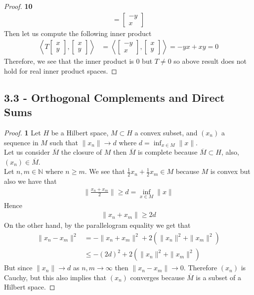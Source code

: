 \documentclass[11pt]{article}
\newcommand{\N}{\mathbb{N}}
\newcommand{\inprd}[1]{\left\langle{#1}\right\rangle}
\theoremstyle{definition}
\begin{document}
\begin{proof}{\textbf{10}}
\begin{align*}
    = \begin{bmatrix} -y \\ x \end{bmatrix}
\end{align*}
Then let us compute the following inner product
\begin{align*}
    \inprd{T\begin{bmatrix} x \\y \end{bmatrix},
    \begin{bmatrix} x \\y \end{bmatrix}}
    &= \inprd{\begin{bmatrix} -y \\x \end{bmatrix},
    \begin{bmatrix} x \\y \end{bmatrix}}
    = -yx + xy = 0
\end{align*}
Therefore, we see that the inner product is 0 but $T \neq 0$ so above result
does not hold for real inner product spaces.
\end{proof}

\cleardoublepage
\subsection*{3.3 - Orthogonal Complements and Direct Sums}
\begin{proof}{\textbf{1}}
Let $H$ be a Hilbert space, $M \subset H$ a convex subset, and $(x_n)$ a
sequence in $M$ such that $\|x_n\| \to d$ where $d = \inf_{x \in M}\|x\|$.
\\
Let us consider $\overline{M}$ the closure of $M$ then $\overline{M}$ is
complete because $\overline{M}\subset H$, also, $(x_n) \in \overline{M}$.
\\
Let $n,m \in \N$ where $n \geq m$.
We see that $\frac{1}{2}x_n + \frac{1}{2}x_m \in M$ because $M$ is convex but
also we have that
\begin{align*}
    \bigg\|\frac{x_n + x_m}{2}\bigg\| \geq d = \inf_{x \in M} \|x\|
\end{align*}
Hence
\begin{align*}
    \|x_n + x_m\| \geq 2d
\end{align*}
On the other hand, by the parallelogram equality we get that
\begin{align*}
    \|x_n - x_m\|^2 &= - \|x_n + x_m\|^2 + 2(\|x_n\|^2 + \|x_m\|^2)\\
    &\leq -(2d)^2 + 2(\|x_n\|^2 + \|x_m\|^2)
\end{align*}
But since $\|x_n\| \to d$ as $n, m \to \infty$ then $\|x_n - x_m\| \to 0$.
Therefore $(x_n)$ is Cauchy, but this also implies that $(x_n)$ converges
because $\overline{M}$ is a subset of a Hilbert space.
\end{proof}
\end{document}
